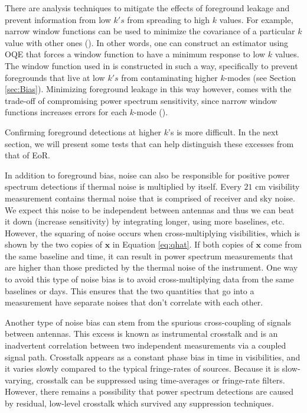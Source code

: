 \documentclass[preprint2,numberedappendix,tighten]{aastex6}  %
\begin{document}
There are analysis techniques to mitigate the effects of foreground leakage and prevent information from low $k's$ from spreading to high $k$ values. For example, narrow window functions can be used to minimize the covariance of a particular $k$ value with other ones (\citealt{liu_et_al2014b}). In other words, one can construct an estimator using OQE that forces a window function to have a minimum response to low $k$ values. The window function used in \citet{ali_et_al2015} is constructed in such a way, specifically to prevent foregrounds that live at low $k's$ from contaminating higher $k$-modes (see Section \ref{sec:Bias}). Minimizing foreground leakage in this way however, comes with the trade-off of compromising power spectrum sensitivity, since narrow window functions increases errors for each $k$-mode (\citealt{liu_et_al2014b}). 

Confirming foreground detections at higher $k$'s is more difficult. In the next section, we will present some tests that can help distinguish these excesses from that of EoR. 

In addition to foreground bias, noise can also be responsible for positive power spectrum detections if thermal noise is multiplied by itself. Every $21$ cm visibility measurement contains thermal noise that is comprised of receiver and sky noise. We expect this noise to be independent between antennas and thus we can beat it down (increase sensitivity) by integrating longer, using more baselines, etc. However, the squaring of noise occurs when cross-multiplying visibilities, which is shown by the two copies of $\textbf{x}$ in Equation \eqref{eq:qhat}. If both copies of $\textbf{x}$ come from the same baseline and time, it can result in power spectrum measurements that are higher than those predicted by the thermal noise of the instrument. One way to avoid this type of noise bias is to avoid cross-multiplying data from the same baselines or days. This ensures that the two quantities that go into a measurement have separate noises that don't correlate with each other. 

Another type of noise bias can stem from the spurious cross-coupling of signals between antennas. This excess is known as instrumental crosstalk and is an inadvertent correlation between two independent measurements via a coupled signal path. Crosstalk appears as a constant phase bias in time in visibilities, and it varies slowly compared to the typical fringe-rates of sources. Because it is slow-varying, crosstalk can be suppressed using time-averages or fringe-rate filters. However, there remains a possibility that power spectrum detections are caused by residual, low-level crosstalk which survived any suppression techniques. 
\end{document}
